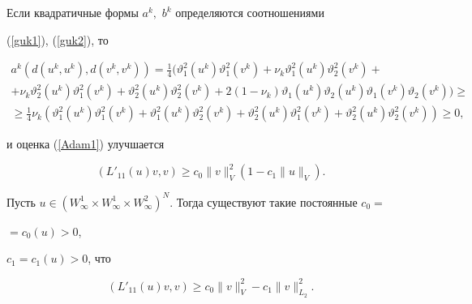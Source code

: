 \begin{note}


Если квадратичные формы $a^k,$ $b^k$ определяются соотношениями 


(\ref{guk1}), (\ref{guk2}), то 


\begin{gather*}


a^k(d(u^k,u^k),d(v^k,v^k)) = \frac{1}{4}


( \vartheta_1^2 (u^k ) \vartheta_1^2 (v^k ) +


 \nu _k \vartheta_1^2 (u^k ) \vartheta_2^2 (v^k ) +\\


%


+\nu _k \vartheta_2^2 (u^k ) \vartheta_1^2 (v^k ) +


 \vartheta_2^2 (u^k ) \vartheta_2^2 (v^k ) 


+2 (1 - \nu _k ) 


\vartheta_1 (u^k ) \vartheta_2 (u^k )


\vartheta_1 (v^k ) \vartheta_2 (v^k ) ) \ge\\


%


\ge


\frac{1}{4} \nu _k ( \vartheta_1^2 (u^k ) \vartheta_1^2 (v^k ) +


\vartheta_1^2 (u^k ) \vartheta_2^2 (v^k ) +


\vartheta_2^2 (u^k ) \vartheta_1^2 (v^k ) 


+ \vartheta_2^2 (u^k ) \vartheta_2^2 (v^k ) ) \ge 0,


\end{gather*}


и оценка (\ref{Adam1}) улучшается


$$


 \left ( L'_{11} (u) v, v \right ) 


\ge c_0 \|v \|_V^2 ( 1 - c_1 \|u\|_V ).


$$


\end{note}





\begin{lem}


Пусть $ u \in ( W^1_\infty \times W^1_\infty \times W^2_


\infty )^N $. Тогда существуют такие постоянные $c_0=$\linebreak




$=c_0(u)>0$,


$c_1 = c_1(u) > 0$, что 


\begin{equation}


\label{Adam2}


\left ( L'_{11} ( u)v, v \right ) \ge c_0 \| v\|_V^2 - 


c_1 \| v \|_{L_2}^2.


\end{equation}


\end{lem} 





